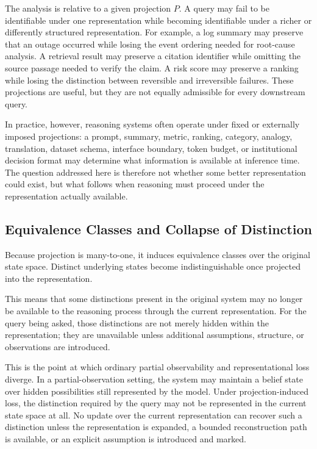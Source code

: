 \documentclass[11pt]{article}
\begin{document}
The analysis is relative to a given projection $P$. A query may fail to be identifiable under one representation while becoming identifiable under a richer or differently structured representation. For example, a log summary may preserve that an outage occurred while losing the event ordering needed for root-cause analysis. A retrieval result may preserve a citation identifier while omitting the source passage needed to verify the claim. A risk score may preserve a ranking while losing the distinction between reversible and irreversible failures. These projections are useful, but they are not equally admissible for every downstream query.

In practice, however, reasoning systems often operate under fixed or externally imposed projections: a prompt, summary, metric, ranking, category, analogy, translation, dataset schema, interface boundary, token budget, or institutional decision format may determine what information is available at inference time. The question addressed here is therefore not whether some better representation could exist, but what follows when reasoning must proceed under the representation actually available.

\subsection{Equivalence Classes and Collapse of Distinction}

Because projection is many-to-one, it induces equivalence classes over the original state space. Distinct underlying states become indistinguishable once projected into the representation.

This means that some distinctions present in the original system may no longer be available to the reasoning process through the current representation. For the query being asked, those distinctions are not merely hidden within the representation; they are unavailable unless additional assumptions, structure, or observations are introduced.

This is the point at which ordinary partial observability and representational loss diverge. In a partial-observation setting, the system may maintain a belief state over hidden possibilities still represented by the model. Under projection-induced loss, the distinction required by the query may not be represented in the current state space at all. No update over the current representation can recover such a distinction unless the representation is expanded, a bounded reconstruction path is available, or an explicit assumption is introduced and marked.
\end{document}
